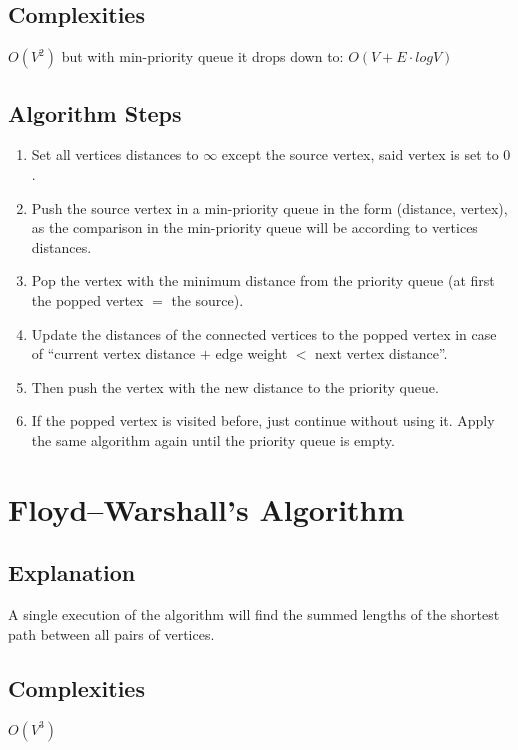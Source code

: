 \documentclass[]{article}
\begin{document}
	\subsection{Complexities}
	\textit{$O(V^2)$} but with min-priority queue it drops down to: \textit{$O(V+E \cdot log V)$}
	\subsection{Algorithm Steps}
	\begin{enumerate}
		\item Set all vertices distances to $\infty$ except the source vertex, said vertex is set to $0$.
		\item Push the source vertex in a min-priority queue in the form (distance, vertex), as the comparison in the min-priority queue will be according to vertices distances.
		\item Pop the vertex with the minimum distance from the priority queue (at first the popped vertex $=$ the source).
		\item Update the distances of the connected vertices to the popped vertex in case of ``current vertex distance $+$ edge weight $<$ next vertex distance''. 
		\item Then push the vertex with the new distance to the priority queue.
		\item If the popped vertex is visited before, just continue without using it.
		Apply the same algorithm again until the priority queue is empty.
	\end{enumerate}


\section{Floyd–Warshall's Algorithm}
	\subsection{Explanation}
	\par A single execution of the algorithm will find the summed lengths of the shortest path between all pairs of vertices.
	
	\subsection{Complexities}
	\par \textit{$O(V^3)$}
	
\end{document}
